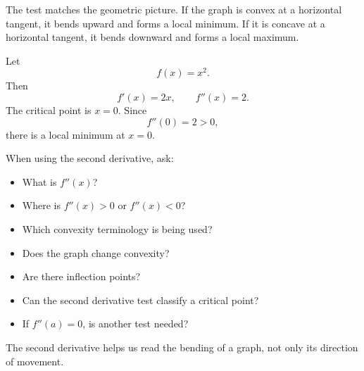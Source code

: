 The test matches the geometric picture. If the graph is convex at a horizontal tangent, it bends upward and forms a local minimum. If it is concave at a horizontal tangent, it bends downward and forms a local maximum.

\begin{examplebox}
Let
\[
f(x)=x^2.
\]
Then
\[
f'(x)=2x,
\qquad
f''(x)=2.
\]
The critical point is \(x=0\). Since
\[
f''(0)=2>0,
\]
there is a local minimum at \(x=0\).
\end{examplebox}

\begin{summarybox}
When using the second derivative, ask:
\begin{itemize}
\item What is \(f''(x)\)?
\item Where is \(f''(x)>0\) or \(f''(x)<0\)?
\item Which convexity terminology is being used?
\item Does the graph change convexity?
\item Are there inflection points?
\item Can the second derivative test classify a critical point?
\item If \(f''(a)=0\), is another test needed?
\end{itemize}
\end{summarybox}

The second derivative helps us read the bending of a graph, not only its direction of movement.

